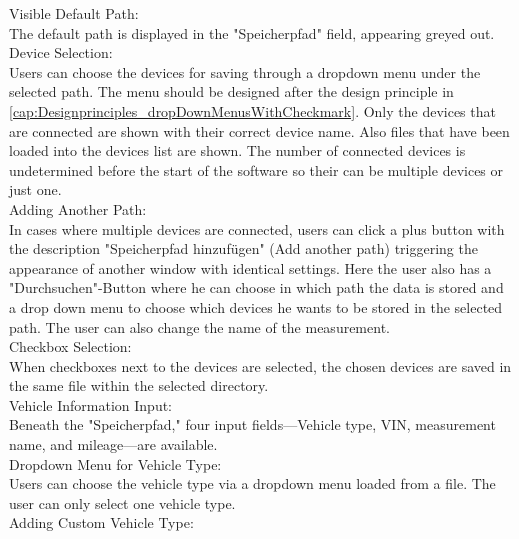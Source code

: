 \documentclass{scrreprt}
\begin{document}
Visible Default Path:\\

The default path is displayed in the "Speicherpfad" field, appearing greyed out.\\

Device Selection:\\

Users can choose the devices for saving through a dropdown menu under the selected path. The menu should be designed after the design principle in \ref{cap:Designprinciples_dropDownMenusWithCheckmark}.
Only the devices that are connected are shown with their correct device name.
Also files that have been loaded into the devices list are shown.
The number of connected devices is undetermined before the start of the software so their can be multiple devices or just one.\\

Adding Another Path:\\

In cases where multiple devices are connected, users can click a plus button with the description "Speicherpfad hinzufügen" (Add another path) triggering the appearance of another window with identical settings. Here the user also has a "Durchsuchen"-Button where he can choose in which path the data is stored and a drop down menu to choose which devices he wants to be stored in the selected path. The user can also change the name of the measurement.\\

Checkbox Selection:\\

When checkboxes next to the devices are selected, the chosen devices are saved in the same file within the selected directory.\\

Vehicle Information Input:\\

Beneath the "Speicherpfad," four input fields—Vehicle type, VIN, measurement name, and mileage—are available.\\

Dropdown Menu for Vehicle Type:\\

Users can choose the vehicle type via a dropdown menu loaded from a file. The user can only select one vehicle type.\\

Adding Custom Vehicle Type:\\
\end{document}
